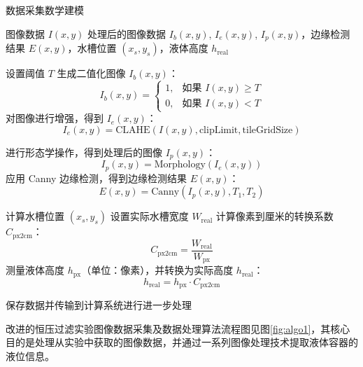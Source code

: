 \begin{breakablealgorithm}
    \caption{数据采集数学建模}
    \begin{algorithmic}[1]
        \Require 图像数据 $I(x, y)$
        \Ensure 处理后的图像数据 $I_b(x, y)$, $I_e(x, y)$, $I_p(x, y)$，边缘检测结果 $E(x, y)$，水槽位置 $(x_s, y_s)$，液体高度 $h_{\text{real}}$
        
            \State 设置阈值 $T$
            \State 生成二值化图像 $I_b(x, y)$：
            \[
            I_b(x, y) = 
            \begin{cases} 
            1, & \text{如果 } I(x, y) \geq T \\
            0, & \text{如果 } I(x, y) < T
            \end{cases}
            \]
            \State 对图像进行增强，得到 $I_e(x, y)$：
            \[
            I_e(x, y) = \text{CLAHE}(I(x, y), \text{clipLimit}, \text{tileGridSize})
            \]
        \EndFunction

            \State 进行形态学操作，得到处理后的图像 $I_p(x, y)$：
            \[
            I_p(x, y) = \text{Morphology}(I_e(x, y))
            \]
            \State 应用 Canny 边缘检测，得到边缘检测结果 $E(x, y)$：
            \[
            E(x, y) = \text{Canny}(I_p(x, y), T_1, T_2)
            \]
        \EndFunction

            \State 计算水槽位置 $(x_s, y_s)$
            \State 设置实际水槽宽度 $W_{\text{real}}$
            \State 计算像素到厘米的转换系数 $C_{\text{px2cm}}$：
            \[
            C_{\text{px2cm}} = \frac{W_{\text{real}}}{W_{\text{px}}}
            \]
            \State 测量液体高度 $h_{\text{px}}$（单位：像素），并转换为实际高度 $h_{\text{real}}$：
            \[
            h_{\text{real}} = h_{\text{px}} \cdot C_{\text{px2cm}}
            \]
        \EndFunction
        
            \State 保存数据并传输到计算系统进行进一步处理
        \EndFunction
    \end{algorithmic}
\end{breakablealgorithm}

改进的恒压过滤实验图像数据采集及数据处理算法流程图见图\ref{fig:algo1}，其核心目的是处理从实验中获取的图像数据，并通过一系列图像处理技术提取液体容器的液位信息。

